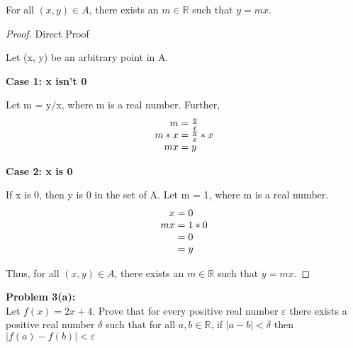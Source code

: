 \documentclass{article}
\begin{document}
For all \((x, y) \in A\), there exists an \(m \in \mathbb{R}\) such that \(y = mx\). 
\vspace{1cm}  %
\begin{proof} 

Direct Proof

\vspace{1em}
Let (x, y) be an arbitrary point in A.  

\textbf{Case 1: x isn't 0}

Let m = y/x, where m is a real number. Further,
\begin{equation*}
\begin{gathered}
\begin{array}{r@{{}={}}l}
m &\frac{y}{x} \\
 m * x & \frac{y}{x} * x  \\
mx & y \\

\end{array}
\end{gathered}
\end{equation*}
\vspace{1cm}

\textbf{Case 2: x is 0}

If x is 0, then y is 0 in the set of A. Let m = 1, where m is a real number.
\begin{equation*}
\begin{gathered}
\begin{array}{r@{{}={}}l}
x & 0 \\
mx & 1 * 0 \\
    & 0 \\
    & y \\
\end{array}
\end{gathered}
\end{equation*}



Thus, for all \((x, y) \in A\), there exists an \(m \in \mathbb{R}\) such that \(y = mx\). 

\end{proof}
\vspace{1cm}  %


\vspace{.5cm} %


\newpage
\textbf{Problem 3(a):} \\
Let \( f(x) = 2x + 4 \). Prove that for every positive real number \( \varepsilon \) there exists
a positive real number \( \delta \) such that for all \( a, b \in \mathbb{R} \), if \( |a - b| < \delta \) then
\( |f(a) - f(b)| < \varepsilon \)
\vspace{.5cm}  %
\end{document}

